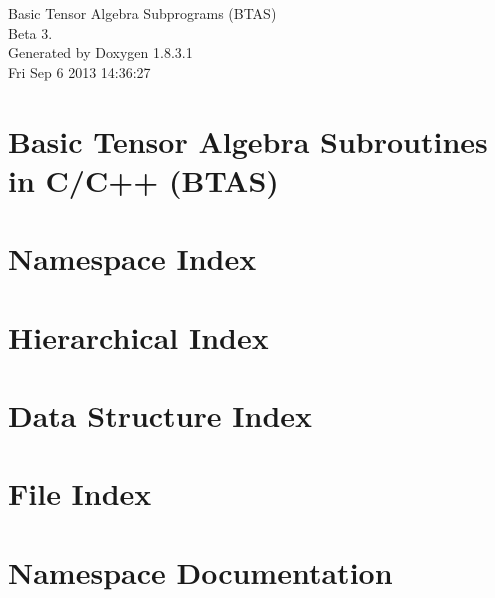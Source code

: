 \documentclass{book}
\begin{document}
\begin{titlepage}
\vspace*{7cm}
\begin{center}
{\Large Basic Tensor Algebra Subprograms (B\-T\-A\-S) \\[1ex]\large Beta 3. }\\
\vspace*{1cm}
{\large Generated by Doxygen 1.8.3.1}\\
\vspace*{0.5cm}
{\small Fri Sep 6 2013 14:36:27}\\
\end{center}
\end{titlepage}
\clearemptydoublepage
{}
\tableofcontents
\clearemptydoublepage
{}
\chapter{Basic Tensor Algebra Subroutines in C/\-C++ (B\-T\-A\-S)}
\label{index}
\chapter{Namespace Index}

\chapter{Hierarchical Index}

\chapter{Data Structure Index}

\chapter{File Index}

\chapter{Namespace Documentation}




\end{document}
